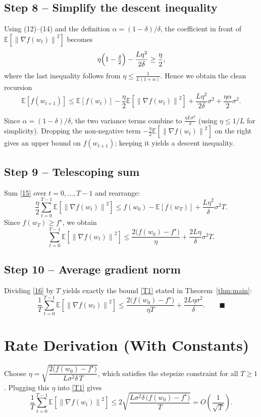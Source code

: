 \documentclass{article}
\newcommand{\E}{\mathbb{E}}
\newcommand{\norm}[1]{\left\lVert#1\right\rVert}
\begin{document}
\subsection*{Step 8 – Simplify the descent inequality}
Using (12)–(14) and the definition $\alpha=(1-\delta)/\delta$,
the coefficient in front of $\E[\norm{\nabla f(w_t)}^{2}]$ becomes
\[
\eta\Bigl(1-\tfrac{\delta}{2}\Bigr)-\frac{L\eta^{2}}{2\delta}
\ge \frac{\eta}{2},
\]
where the last inequality follows from $\eta\le\frac{1}{L(1+\alpha)}$.
Hence we obtain the clean recursion
\[
\E\!\left[f(w_{t+1})\right]
\le \E\!\left[f(w_t)\right]
-\frac{\eta}{2}\E\!\left[\norm{\nabla f(w_t)}^{2}\right]
+\frac{L\eta^{2}}{2\delta}\sigma^{2}
+\frac{\eta\alpha}{2}\sigma^{2}. \tag{15}
\]

Since $\alpha=(1-\delta)/\delta$, the two variance terms combine to
$\frac{\eta L\sigma^{2}}{\delta}$ (using $\eta\le 1/L$ for simplicity).  Dropping the
non‑negative term $-\frac{\eta}{2}\E[\norm{\nabla f(w_t)}^{2}]$ on the right
gives an upper bound on $f(w_{t+1})$; keeping it yields a descent
inequality.

\subsection*{Step 9 – Telescoping sum}
Sum \eqref{15} over $t=0,\dots,T-1$ and rearrange:
\[
\frac{\eta}{2}\sum_{t=0}^{T-1}\E\!\left[\norm{\nabla f(w_t)}^{2}\right]
\le f(w_0)-\E\!\left[f(w_T)\right]
+ \frac{L\eta^{2}}{\delta}\sigma^{2}T .
\]
Since $f(w_T)\ge f^\star$, we obtain
\[
\sum_{t=0}^{T-1}\E\!\left[\norm{\nabla f(w_t)}^{2}\right]
\le \frac{2\bigl(f(w_0)-f^\star\bigr)}{\eta}
+ \frac{2L\eta}{\delta}\sigma^{2}T . \tag{16}
\]

\subsection*{Step 10 – Average gradient norm}
Dividing \eqref{16} by $T$ yields exactly the bound \eqref{T1} stated in
Theorem~\ref{thm:main}:
\[
\frac{1}{T}\sum_{t=0}^{T-1}\E\!\left[\norm{\nabla f(w_t)}^{2}\right]
\le \frac{2\bigl(f(w_0)-f^\star\bigr)}{\eta T}
+ \frac{2L\eta\sigma^{2}}{\delta}.
\qquad\blacksquare
\]

\section*{Rate Derivation (With Constants)}
Choose $\eta = \sqrt{\dfrac{2\bigl(f(w_0)-f^\star\bigr)}{L\sigma^{2}\delta\,T}}$,
which satisfies the stepsize constraint for all $T\ge1$.
Plugging this $\eta$ into \eqref{T1} gives
\[
\frac{1}{T}\sum_{t=0}^{T-1}\E\!\left[\norm{\nabla f(w_t)}^{2}\right]
\le
2\sqrt{\frac{L\sigma^{2}\delta\,\bigl(f(w_0)-f^\star\bigr)}{T}}
= O\!\left(\frac{1}{\sqrt{T}}\right).
\]
\end{document}
